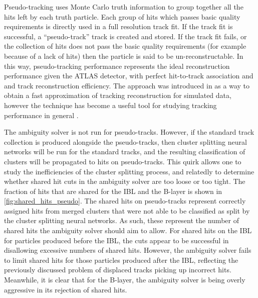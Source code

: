 Pseudo-tracking uses Monte Carlo truth information to group together all the hits left by each truth particle.
Each group of hits which passes basic quality requirements is directly used in a full resolution track fit.
If the track fit is successful, a ``pseudo-track'' track is created and stored.
If the track fit fails, or the collection of hits does not pass the basic quality requirements (for example because of a lack of hits) then the particle is said to be un-reconstructable.
In this way, pseudo-tracking performance represents the ideal reconstruction performance given the ATLAS detector, with perfect hit-to-track association and and track reconstruction efficiency.
The approach was introduced in \cite{Jansky:2013ryb} as a way to obtain a fast approximation of tracking reconstruction for simulated data, however the technique has become a useful tool for studying tracking performance in general \cite{ATL-PHYS-PUB-2015-006}.

The ambiguity solver is not run for pseudo-tracks.
However, if the standard track collection is produced alongside the pseudo-tracks, then cluster splitting neural networks will be run for the standard tracks, and the resulting classification of clusters will be propagated to hits on pseudo-tracks.
This quirk allows one to study the inefficiencies of the cluster splitting process, and relatedly to determine whether shared hit cuts in the ambiguity solver are too loose or too tight.
The fraction of hits that are shared for the IBL and the B-layer is shown in \cref{fig:shared_hits_pseudo}.
The shared hits on pseudo-tracks represent correctly assigned hits from merged clusters that were not able to be classified as split by the cluster splitting neural networks.
As such, these represent the number of shared hits the ambiguity solver should aim to allow.
For shared hits on the IBL for particles produced before the IBL, the cuts appear to be successful in disallowing excessive numbers of shared hits.
However, the ambiguity solver fails to limit shared hits for those particles produced after the IBL, reflecting the previously discussed problem of displaced tracks picking up incorrect hits.
Meanwhile, it is clear that for the B-layer, the ambiguity solver is being overly aggressive in its rejection of shared hits.

